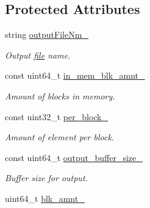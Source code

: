 \subsection*{Protected Attributes}
\begin{CompactItemize}
\item 
\hypertarget{classAlphaSort_935814c771911e81dc5e7edde0171bbe}{
string \hyperlink{classAlphaSort_935814c771911e81dc5e7edde0171bbe}{outputFileNm\_\-}}
\label{classAlphaSort_935814c771911e81dc5e7edde0171bbe}

\begin{CompactList}\small\item\em Output \hyperlink{classfile}{file} name. \item\end{CompactList}\item 
\hypertarget{classAlphaSort_6fa4fe898211dc5a50b80cc237e22353}{
const uint64\_\-t \hyperlink{classAlphaSort_6fa4fe898211dc5a50b80cc237e22353}{in\_\-mem\_\-blk\_\-amnt\_\-}}
\label{classAlphaSort_6fa4fe898211dc5a50b80cc237e22353}

\begin{CompactList}\small\item\em Amount of blocks in memory. \item\end{CompactList}\item 
\hypertarget{classAlphaSort_b3985229fae3c00b41ff82378963c3f0}{
const uint32\_\-t \hyperlink{classAlphaSort_b3985229fae3c00b41ff82378963c3f0}{per\_\-block\_\-}}
\label{classAlphaSort_b3985229fae3c00b41ff82378963c3f0}

\begin{CompactList}\small\item\em Amount of element per block. \item\end{CompactList}\item 
\hypertarget{classAlphaSort_b7826522f84407b5f4e2d344175818c9}{
const uint64\_\-t \hyperlink{classAlphaSort_b7826522f84407b5f4e2d344175818c9}{output\_\-buffer\_\-size\_\-}}
\label{classAlphaSort_b7826522f84407b5f4e2d344175818c9}

\begin{CompactList}\small\item\em Buffer size for output. \item\end{CompactList}\item 
\hypertarget{classAlphaSort_34c1cf131152ececb0487e26d8f7c43a}{
uint64\_\-t \hyperlink{classAlphaSort_34c1cf131152ececb0487e26d8f7c43a}{blk\_\-amnt\_\-}}
\label{classAlphaSort_34c1cf131152ececb0487e26d8f7c43a}


\end{CompactItemize}
